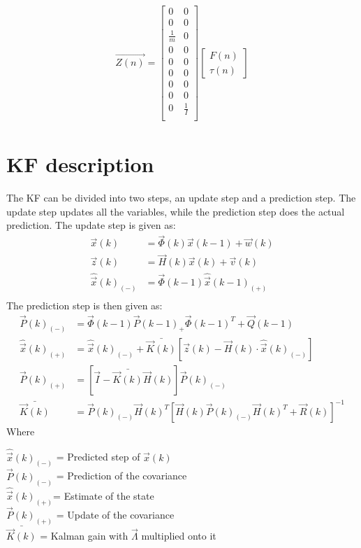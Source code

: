 \begin{align}
\vec{Z(n)} = \begin{bmatrix}
0 & 0\\
0 & 0\\
\frac{1}{m} & 0\\
0 & 0\\
0 & 0\\
0 & 0\\
0 & 0\\
0 & 0\\
0 & \frac{1}{I}\\
\end{bmatrix}\begin{bmatrix}
F(n)\\
\tau(n)
\end{bmatrix}
\end{align}

\section{\ac{KF} description}
The \ac{KF} can be divided into two steps, an update step and a prediction step. The update step updates all the variables, while the prediction step does the actual prediction. The update step is given as:
\begin{align}
\vec{x}(k) &= \vec{\Phi}(k)\vec{x}(k-1) + \vec{w}(k)\\
\vec{z}(k) &= \vec{H}(k)\vec{x}(k) + \vec{v}(k)\\
\hat{\vec{x}}(k)_{(-)} &= \vec{\Phi}(k-1)\hat{\vec{x}}(k-1)_{(+)}\\
\end{align}
The prediction step is then given as:
\begin{align}
\vec{P}(k)_{(-)} &= \vec{\Phi}(k-1) \vec{P}(k-1)_+ \vec{\Phi}(k-1)^T + \vec{Q}(k-1)\\
\hat{\vec{x}}(k)_{(+)} &= \hat{\vec{x}}(k)_{(-)} + \bar{\vec{K}(k)}[\vec{z}(k) - \vec{H}(k)\cdot\hat{\vec{x}}(k)_{(-)}]\\
\vec{P}(k)_{(+)}&= [\vec{I} - \bar{\vec{K}(k)}\vec{H}(k)]\vec{P}(k)_{(-)}\\
\bar{\vec{K}(k)} &= \vec{P}(k)_{(-)} \vec{H}(k)^T [\vec{H}(k)\vec{P}(k)_{(-)} \vec{H}(k)^T + \vec{R}(k)]^{-1}
\end{align}
\noindent Where
\begin{ffk}
$\hat{\vec{x}}(k)_{(-)}$ = Predicted step of $\vec{x}(k)$\\
$\vec{P}(k)_{(-)}$ = Prediction of the covariance\\
$\hat{\vec{x}}(k)_{(+)}$= Estimate of the state\\
$\vec{P}(k)_{(+)}$ = Update of the covariance\\
$\bar{\vec{K}(k)}$ = Kalman gain with $\vec{\Lambda}$ multiplied onto it
\end{ffk}

